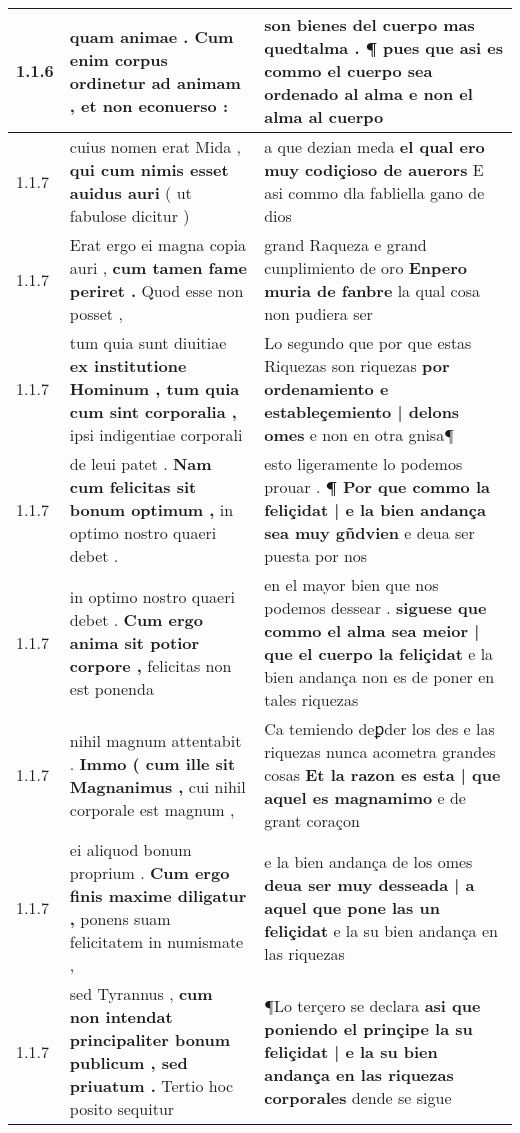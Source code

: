 \begin{tabular}{|p{1cm}|p{6.5cm}|p{6.5cm}|}
1.1.6 & quam animae . \textbf{ Cum enim corpus ordinetur ad animam , } et non econuerso : & son bienes del cuerpo \textbf{ mas quedtalma . ¶ pues que asi es commo el cuerpo sea ordenado al alma } e non el alma al cuerpo \\\hline
1.1.7 & cuius nomen erat Mida , \textbf{ qui cum nimis esset auidus auri } ( ut fabulose dicitur ) & a que dezian meda \textbf{ el qual ero muy codiçioso de auerors } E asi commo dla fabliella gano de dios \\\hline
1.1.7 & Erat ergo ei magna copia auri , \textbf{ cum tamen fame periret . } Quod esse non posset , & grand Raqueza e grand cunplimiento de oro \textbf{ Enpero muria de fanbre } la qual cosa non pudiera ser \\\hline
1.1.7 & tum quia sunt diuitiae \textbf{ ex institutione Hominum , tum quia cum sint corporalia , } ipsi indigentiae corporali & Lo segundo que por que estas Riquezas son riquezas \textbf{ por ordenamiento e estableçemiento | delons omes } e non en otra gnisa¶ \\\hline
1.1.7 & de leui patet . \textbf{ Nam cum felicitas sit bonum optimum , } in optimo nostro quaeri debet . & esto ligeramente lo podemos prouar . \textbf{ ¶ Por que commo la feliçidat | e la bien andança sea muy gñdvien } e deua ser puesta por nos \\\hline
1.1.7 & in optimo nostro quaeri debet . \textbf{ Cum ergo anima sit potior corpore , } felicitas non est ponenda & en el mayor bien que nos podemos dessear . \textbf{ siguese que commo el alma sea meior | que el cuerpo la feliçidat } e la bien andança non es de poner en tales riquezas \\\hline
1.1.7 & nihil magnum attentabit . \textbf{ Immo ( cum ille sit Magnanimus , } cui nihil corporale est magnum , & Ca temiendo deꝑder los des e las riquezas nunca acometra grandes cosas \textbf{ Et la razon es esta | que aquel es magnamimo } e de grant coraçon \\\hline
1.1.7 & ei aliquod bonum proprium . \textbf{ Cum ergo finis maxime diligatur , } ponens suam felicitatem in numismate , & e la bien andança de los omes \textbf{ deua ser muy desseada | a aquel que pone las un feliçidat } e la su bien andança en las riquezas \\\hline
1.1.7 & sed Tyrannus , \textbf{ cum non intendat principaliter bonum publicum , sed priuatum . } Tertio hoc posito sequitur & ¶Lo terçero se declara \textbf{ asi que poniendo el prinçipe la su feliçidat | e la su bien andança en las riquezas corporales } dende se sigue \\\hline

\end{tabular}
